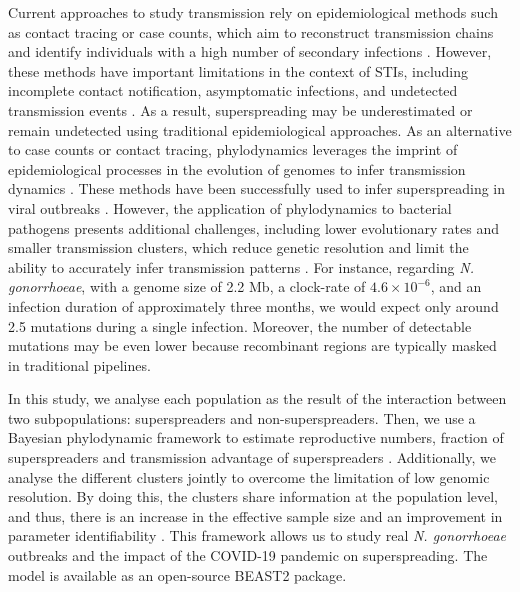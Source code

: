 \documentclass[lineno,pdflatex,sn-nature]{sn-jnl}%
\theoremstyle{thmstyleone}%
\theoremstyle{thmstyletwo}%
\theoremstyle{thmstylethree}%
\begin{document}
Current approaches to study transmission rely on epidemiological methods such as contact tracing or case counts, which aim to reconstruct transmission chains and identify individuals with a high number of secondary infections \cite{RefWorks:lloyd-smith2007maximum, RefWorks:grassly2008mathematical}. However, these methods have important limitations in the context of STIs, including incomplete contact notification, asymptomatic infections, and undetected transmission events \cite{RefWorks:giguere2019biological, RefWorks:farrahi2014epidemic}. As a result, superspreading may be underestimated or remain undetected using traditional epidemiological approaches. As an alternative to case counts or contact tracing, phylodynamics leverages the imprint of epidemiological processes in the evolution of genomes to infer transmission dynamics \cite{RefWorks:volz2013viral, RefWorks:grenfell2004unifying, leo2022epidemiological}. These methods have been successfully used to infer superspreading in viral outbreaks \cite{RefWorks:li2017quantifying, RefWorks:stadler2013uncovering}. However, the application of phylodynamics to bacterial pathogens presents additional challenges, including lower evolutionary rates and smaller transmission clusters, which reduce genetic resolution and limit the ability to accurately infer transmission patterns \cite{Ingle2021Development}. For instance, regarding \textit{N. gonorrhoeae}, with a genome size of 2.2 Mb, a clock-rate of $4.6\times10^{-6}$, and an infection duration of approximately three months, we would expect only around 2.5 mutations during a single infection. Moreover, the number of detectable mutations may be even lower because recombinant regions are typically masked in traditional pipelines. \newline

In this study, we analyse each population as the result of the interaction between two subpopulations: superspreaders and non-superspreaders. Then, we use a Bayesian phylodynamic framework to estimate reproductive numbers, fraction of superspreaders and transmission advantage of superspreaders \cite{stadler2013birth}. Additionally, we analyse the different clusters jointly to overcome the limitation of low genomic resolution. By doing this, the clusters share information at the population level, and thus, there is an increase in the effective sample size and an improvement in parameter identifiability \cite{RefWorks:mcelreath2020statistical}. This framework allows us to study real \textit{N. gonorrhoeae} outbreaks and the impact of the COVID-19 pandemic on superspreading. The model is available as an open-source BEAST2 \cite{RefWorks:bouckaert2014beast} package.
\end{document}
